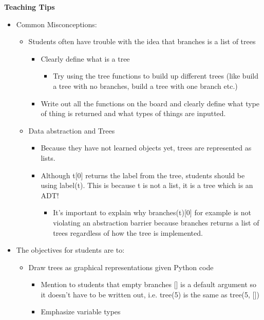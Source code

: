 \begin{blocksection}
	\begin{guide}
	\textbf{Teaching Tips}
	\begin{itemize}
			\item Common Misconceptions:
			\begin{itemize}
				\item Students often have trouble with the idea that branches is a list of trees
				\begin{itemize}
					\item Clearly define what is a tree
					\begin{itemize}
						\item Try using the tree functions to build up different trees (like build a tree with no branches, build a tree with one branch etc.)
					\end{itemize}
					\item Write out all the functions on the board and clearly define what type of thing is returned and what types of things are inputted.
				\end{itemize}
				\item Data abstraction and Trees
				\begin{itemize}
					\item Because they have not learned objects yet, trees are represented as lists.
					\item Although t[0] returns the label from the tree, students should be using label(t). This is because t is not a list, it is a tree which is an ADT!
					\begin{itemize}
						\item It’s important to explain why branches(t)[0] for example is not violating an abstraction barrier because branches returns a list of trees regardless of how the tree is implemented.
					\end{itemize}
				\end{itemize}
			\end{itemize}
			\item The objectives for students are to: 
			\begin{itemize}
				\item Draw trees as graphical representations given Python code  
				\begin{itemize}
					\item Mention to students that empty branches [] is a default argument so it doesn’t have to be written out, i.e. tree(5) is the same as tree(5, [])
					\item Emphasize variable types

\end{itemize}
\end{itemize}
\end{itemize}
\end{guide}
\end{blocksection}
